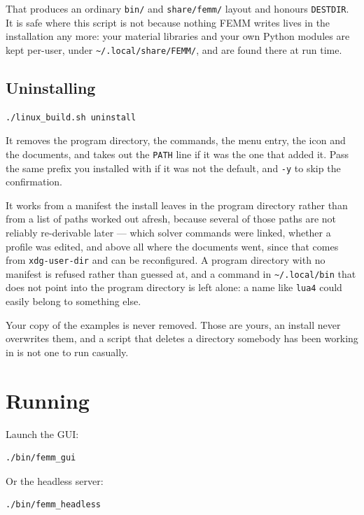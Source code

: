 \documentclass[11pt]{article}
\begin{document}
\noindent That produces an ordinary \texttt{bin/} and
\texttt{share/femm/} layout and honours \texttt{DESTDIR}.  It is safe
where this script is not because nothing FEMM writes lives in the
installation any more: your material libraries and your own Python
modules are kept per-user, under
\texttt{\textasciitilde/.local/share/FEMM/}, and are found there at run
time.

\subsection*{Uninstalling}

\begin{lstlisting}
./linux_build.sh uninstall
\end{lstlisting}

It removes the program directory, the commands, the menu entry, the icon
and the documents, and takes out the \texttt{PATH} line if it was the one
that added it.  Pass the same prefix you installed with if it was not the
default, and \texttt{-y} to skip the confirmation.

It works from a manifest the install leaves in the program directory
rather than from a list of paths worked out afresh, because several of
those paths are not reliably re-derivable later --- which solver
commands were linked, whether a profile was edited, and above all where
the documents went, since that comes from \texttt{xdg-user-dir} and can
be reconfigured.  A program directory with no manifest is refused rather
than guessed at, and a command in \texttt{\textasciitilde/.local/bin}
that does not point into the program directory is left alone: a name
like \texttt{lua4} could easily belong to something else.

Your copy of the examples is never removed.  Those are yours, an install
never overwrites them, and a script that deletes a directory somebody has
been working in is not one to run casually.

\section{Running}

Launch the GUI:
\begin{lstlisting}
./bin/femm_gui
\end{lstlisting}

Or the headless server:
\begin{lstlisting}
./bin/femm_headless
\end{lstlisting}
\end{document}

